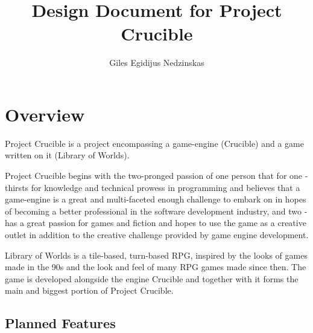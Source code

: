\documentclass[a4paper,10pt]{book}
\begin{document}
\newcommand{\Projectname}{Project Crucible}
\newcommand{\Enginename}{Crucible}
\newcommand{\Gamename}{Library of Worlds}
\newcommand{\TODO}[1]{
  \begin{tabular}{l | l}
    \textcolor{red}{TODO} & \parbox{10cm}{\textcolor{red}{{#1}}} \\
  \end{tabular}
}

\author{Giles Egidijus Nedzinskas}
\title{Design Document for \Projectname{}}
\maketitle{}

\tableofcontents

\chapter{Overview}
\Projectname{} is a project encompassing a game-engine (\Enginename{}) and a game written on it (\Gamename{}).

\Projectname{} begins with the two-pronged passion of one person that for one - thirsts for knowledge and technical prowess in programming and believes that a game-engine is a great and multi-faceted enough challenge to embark on in hopes of becoming a better professional in the software development industry, and two - has a great passion for games and fiction and hopes to use the game as a creative outlet in addition to the creative challenge provided by game engine development.

\Gamename{} is a tile-based, turn-based RPG, inspired by the looks of games made in the 90s and the look and feel of many RPG games made since then. The game is developed alongside the engine \Enginename{} and together with it forms the main and biggest portion of \Projectname{}.

\section{Planned Features}
\end{document}
